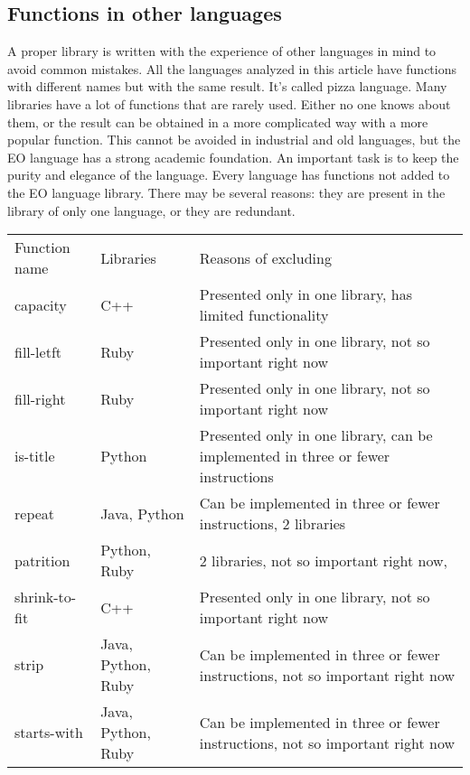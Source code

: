 \documentclass[11pt,nonacm,natbib=false]{acmart}
\begin{document}
\subsection{Functions in other languages}
A proper library is written with the experience of other languages in mind to avoid common mistakes. All the languages analyzed in this article have functions with different names but with the same result. It's called pizza language. Many libraries have a lot of functions that are rarely used. Either no one knows about them, or the result can be obtained in a more complicated way with a more popular function. This cannot be avoided in industrial and old languages, but the EO language has a strong academic foundation. An important task is to keep the purity and elegance of the language. 
Every language has functions not added to the EO language library. There may be several reasons: they are present in the library of only one language, or they are redundant. 
\begin{table}[]
\begin{tabular}{ l | l | p{265pt}}
Function name & Libraries          & Reasons of excluding                                                             \\
capacity      & C++                & Presented only in one library, has limited functionality                         \\
fill-letft    & Ruby               & Presented only in one library, not so important right now                        \\
fill-right    & Ruby               & Presented only in one library, not so important right now                        \\
is-title      & Python             & Presented only in one library, can be implemented in three or fewer instructions \\
repeat        & Java, Python       & Can be implemented in three or fewer instructions, 2 libraries                   \\
patrition     & Python, Ruby       & 2 libraries, not so important right now,                                         \\
shrink-to-fit & C++                & Presented only in one library, not so important right now                        \\
strip         & Java, Python, Ruby & Can be implemented in three or fewer instructions, not so important right now    \\
starts-with   & Java, Python, Ruby & Can be implemented in three or fewer instructions, not so important right now   
\end{tabular}
\end{table}
\end{document}
